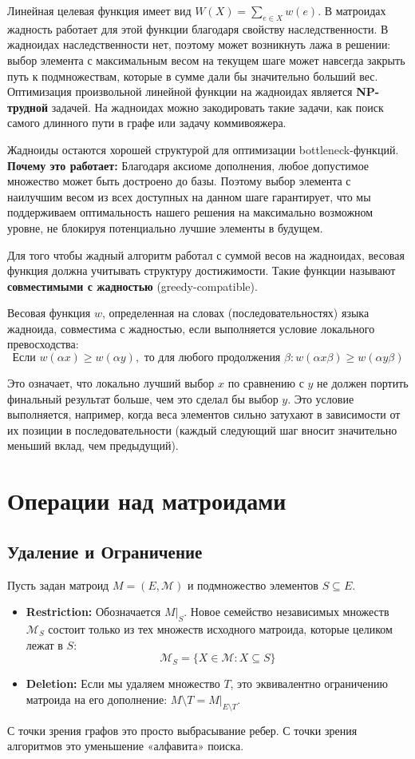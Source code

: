Линейная целевая функция имеет вид $W(X) = \sum_{e \in X} w(e)$. В матроидах жадность работает для этой функции благодаря свойству наследственности. В жадноидах наследственности нет, поэтому может возникнуть лажа в решении: выбор элемента с максимальным весом на текущем шаге может навсегда закрыть путь к подмножествам, которые в сумме дали бы значительно больший вес. \\
Оптимизация произвольной линейной функции на жадноидах является \textbf{NP-трудной} задачей. На жадноидах можно закодировать такие задачи, как поиск самого длинного пути в графе или задачу коммивояжера.

Жадноиды остаются хорошей структурой для оптимизации bottleneck-функций. \\
\textbf{Почему это работает:} 
Благодаря аксиоме дополнения, любое допустимое множество может быть достроено до базы. Поэтому выбор элемента с наилучшим весом из всех доступных на данном шаге гарантирует, что мы поддерживаем оптимальность нашего решения на максимально возможном уровне, не блокируя потенциально лучшие элементы в будущем. 

Для того чтобы жадный алгоритм работал с суммой весов на жадноидах, весовая функция должна учитывать структуру достижимости. Такие функции называют \textbf{совместимыми с жадностью} (greedy-compatible).

Весовая функция $w$, определенная на словах (последовательностях) языка жадноида, совместима с жадностью, если выполняется условие локального превосходства:
\[ \text{Если } w(\alpha x) \geq w(\alpha y), \text{ то для любого продолжения } \beta: w(\alpha x \beta) \geq w(\alpha y \beta) \]

Это означает, что локально лучший выбор $x$ по сравнению с $y$ не должен портить финальный результат больше, чем это сделал бы выбор $y$. Это условие выполняется, например, когда веса элементов сильно затухают в зависимости от их позиции в последовательности (каждый следующий шаг вносит значительно меньший вклад, чем предыдущий).
\newpage
\section{Операции над матроидами}
\subsection{Удаление и Ограничение}
Пусть задан матроид $M = (E, \mathcal{M})$ и подмножество элементов $S \subseteq E$.
\begin{itemize}
    \item \textbf{Restriction:} Обозначается $M|_S$. Новое семейство независимых множеств $\mathcal{M}_S$ состоит только из тех множеств исходного матроида, которые целиком лежат в $S$:
    \[ \mathcal{M}_S = \{X \in \mathcal{M} : X \subseteq S\} \]
    \item \textbf{Deletion:} Если мы удаляем множество $T$, это эквивалентно ограничению матроида на его дополнение: $M \setminus T = M|_{E \setminus T}$.
\end{itemize}
С точки зрения графов это просто выбрасывание ребер. С точки зрения алгоритмов это уменьшение «алфавита» поиска.

